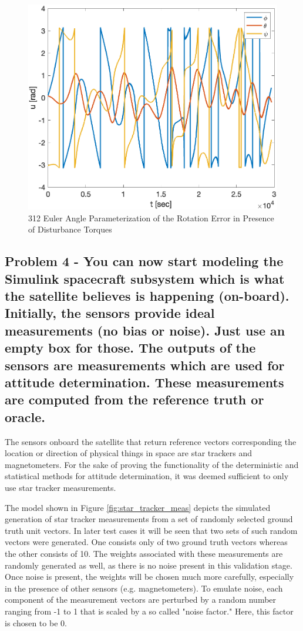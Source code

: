 \begin{figure}[H]
    \centering
    \captionsetup{ justification = centering }
    \includegraphics[width = 12cm]{Images/PS6/attitude_error_dist.png}
    \caption{312 Euler Angle Parameterization of the Rotation Error in Presence of Disturbance Torques}
    \label{fig:attitude_error_dist}
\end{figure}

\subsection{Problem 4 - You can now start modeling the Simulink spacecraft subsystem which is what the satellite believes is happening (on-board). Initially, the sensors provide ideal measurements (no bias or noise). Just use an empty box for those. The outputs of the sensors are measurements which are used for attitude determination. These measurements are computed from the reference truth or oracle.}

The sensors onboard the satellite that return reference vectors corresponding the location or direction of physical things in space are star trackers and magnetometers. For the sake of proving the functionality of the deterministic and statistical methods for attitude determination, it was deemed sufficient to only use star tracker measurements. 

The model shown in Figure \ref{fig:star_tracker_meas} depicts the simulated generation of star tracker measurements from a set of randomly selected ground truth unit vectors. In later test cases it will be seen that two sets of such random vectors were generated. One consists only of two ground truth vectors whereas the other consists of 10. The weights associated with these measurements are randomly generated as well, as there is no noise present in this validation stage. Once noise is present, the weights will be chosen much more carefully, especially in the presence of other sensors (e.g. magnetometers). To emulate noise, each component of the measurement vectors are perturbed by a random number ranging from -1 to 1 that is scaled by a so called "noise factor." Here, this factor is chosen to be 0.

